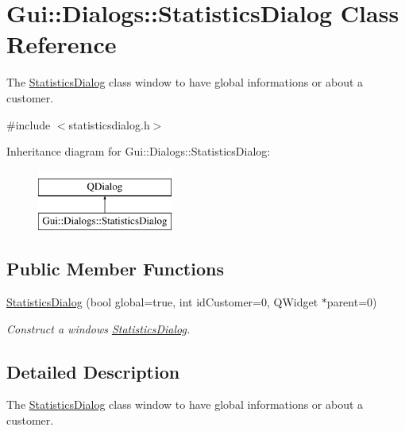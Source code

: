 \hypertarget{classGui_1_1Dialogs_1_1StatisticsDialog}{\section{Gui\-:\-:Dialogs\-:\-:Statistics\-Dialog Class Reference}
\label{classGui_1_1Dialogs_1_1StatisticsDialog}
}


The \hyperlink{classGui_1_1Dialogs_1_1StatisticsDialog}{Statistics\-Dialog} class window to have global informations or about a customer.  




{\ttfamily \#include $<$statisticsdialog.\-h$>$}

Inheritance diagram for Gui\-:\-:Dialogs\-:\-:Statistics\-Dialog\-:\begin{figure}[H]
\begin{center}
\leavevmode
\includegraphics[height=2.000000cm]{d1/ddc/classGui_1_1Dialogs_1_1StatisticsDialog}
\end{center}
\end{figure}
\subsection*{Public Member Functions}
\begin{DoxyCompactItemize}
\item 
\hyperlink{classGui_1_1Dialogs_1_1StatisticsDialog_a6fe5b8b662958e2740f7a5905168bca9}{Statistics\-Dialog} (bool global=true, int id\-Customer=0, Q\-Widget $\ast$parent=0)
\begin{DoxyCompactList}\small\item\em Construct a windows \hyperlink{classGui_1_1Dialogs_1_1StatisticsDialog}{Statistics\-Dialog}. \end{DoxyCompactList}\end{DoxyCompactItemize}


\subsection{Detailed Description}
The \hyperlink{classGui_1_1Dialogs_1_1StatisticsDialog}{Statistics\-Dialog} class window to have global informations or about a customer. 

